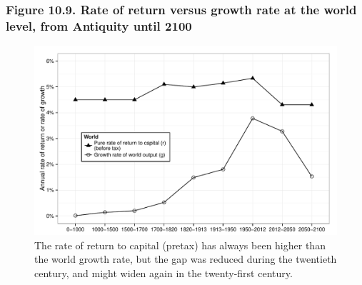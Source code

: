 \documentclass[t]{beamer}\usepackage[]{graphicx}\usepackage[]{color}
\newenvironment{knitrout}{}{} %
\begin{document}
\begin{frame}[label=Figure_10_9]
\frametitle{Figure 10.9. Rate of return versus growth rate at the world level, from Antiquity until 2100}
\begin{figure}[t]
\begin{minipage}[b]{\textwidth}
\centering
\begin{knitrout}\footnotesize
{}\color{fgcolor}

{\centering \includegraphics[width=1\linewidth]{figures/bw/Figure_10_9} 

}



\end{knitrout}
\caption{The rate of return to capital (pretax) has always been higher than the world growth rate, but the gap was reduced during the twentieth century, and might widen again in the twenty-first century.}
\end{minipage}
\end{figure}
\end{frame}
\end{document}
